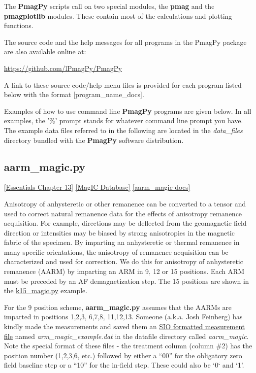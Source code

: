 \documentclass[11pt]{book}
\begin{document}
{ The {\bf PmagPy} scripts call on two special modules, the {\bf pmag} and the {\bf pmagplotlib} modules.  These contain most of the calculations and plotting functions.

 The source code and the help messages for all programs in the PmagPy package are also available online at:


 \url{https://github.com/lPmagPy/PmagPy}

A link to these source code/help menu files is provided for each program listed below with the format [program\_name\_docs].

Examples of how to use command line {\bf PmagPy} programs are given below. In all examples, the '\%' prompt stands for whatever command line prompt you have. The example data files referred to in the following are located in the {\it data\_files} directory bundled with the {\bf PmagPy} software distribution.


\subsection{aarm\_magic.py}
 \href{http://earthref.org/MAGIC/books/Tauxe/Essentials/WebBook3ch13.html#ch13}{[Essentials Chapter 13]}
\href{#MagICDatabase}{[MagIC Database]}
\href{https://github.com/PmagPy/PmagPy/blob/master/programs/aarm_magic.py}{[aarm\_magic docs]}

Anisotropy of anhysteretic or other remanence can be converted to a tensor and used to correct natural remanence data for the effects of anisotropy remanence acquisition.  For example, directions may be deflected from the geomagnetic field direction or intensities may be biased by strong anisotropies in the magnetic fabric of the specimen.  By imparting an anhysteretic or thermal remanence in many specific orientations, the anisotropy of remanence acquisition can be characterized and used for correction.   We do this for anisotropy of anhysteretic remanence (AARM) by imparting an ARM in 9, 12  or 15 positions.  Each ARM must be preceded by an AF demagnetization step.    The 15 positions are shown in the \href{#k15_magic.py}{k15\_magic.py} example.




 For the 9 position scheme,  {\bf aarm\_magic.py} assumes that the AARMs are imparted in positions 1,2,3, 6,7,8, 11,12,13.    Someone (a.k.a. Josh Feinberg) has kindly made the measurements and saved them an \href{#sio_magic.py}{SIO formatted measurement file} named {\it arm\_magic\_example.dat} in the datafile directory called {\it aarm\_magic}.   Note the special format of these files - the treatment column (column \#2) has the position number (1,2,3,6, etc.) followed by either a ``00'' for the obligatory zero field baseline step or a ``10'' for the in-field step.  These could also be `0` and `1'.

}
\end{document}
